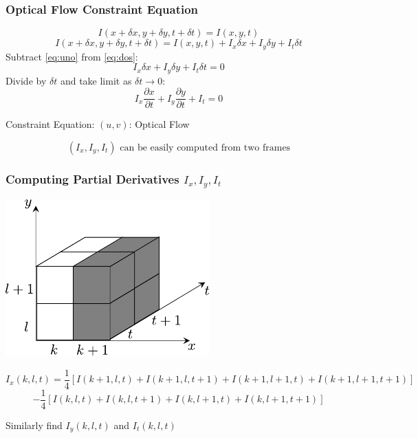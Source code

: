 \begin{frame}
  \frametitle{Optical Flow Constraint Equation}

  \begin{equation}\label{eq:uno}
    I(x + \delta x, y + \delta y, t + \delta t) = I(x, y, t)
  \end{equation}
  \begin{equation}\label{eq:dos}
    I(x + \delta x, y + \delta y, t + \delta t) = I(x, y, t) + I_x \delta x + I_y \delta y + I_t \delta t
  \end{equation}
  Subtract \eqref{eq:uno} from \eqref{eq:dos}: \quad 
  \[
  I_x \delta x + I_y \delta y + I_t \delta t = 0
  \]
  Divide by $\delta t$ and take limit as $\delta t \rightarrow 0$: \quad 
  \[
  I_x \frac{\partial x}{\partial t} + I_y \frac{\partial y}{\partial t} + I_t = 0
  \]

  Constraint Equation: \quad {} \quad $(u,v)$: Optical Flow

  \[
  (I_x, I_y, I_t) \text{ can be easily computed from two frames}
  \]

\end{frame}

\begin{frame}
  \frametitle{Computing Partial Derivatives $I_x, I_y, I_t$}

  \begin{center}
    \includegraphics[width=0.35\columnwidth]{./images/optical_flow/computing_partial_derivatives.pdf}
  \end{center}

  \[
  I_x(k, l, t) = \frac{1}{4} [I(k+1,l,t) + I(k+1,l,t+1) + I(k+1,l+1,t) + I(k+1,l+1,t+1)]
  \]
  \[
  - \frac{1}{4}[I(k,l,t) + I(k,l,t+1) + I(k,l+1,t) + I(k,l+1,t+1)]
  \]

  Similarly find $I_y(k,l,t)$ and $I_t(k,l,t)$

\end{frame}

